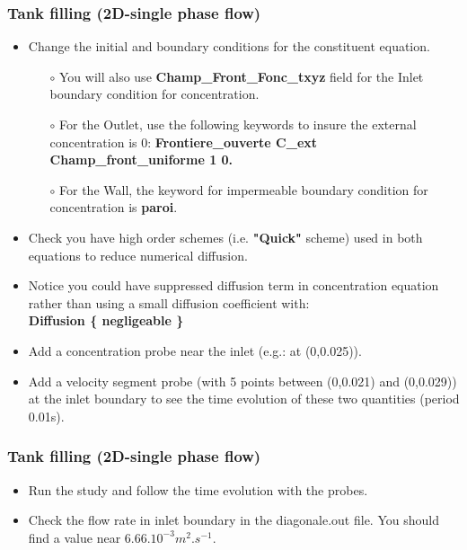 \documentclass[10pt]{beamer}
\begin{document}
\begin{frame}
\frametitle{Tank filling (2D-single phase flow)}
\begin{block}{}

\begin{itemize}
\item Change the initial and boundary conditions for the constituent equation. 
    \begin{itemize}
    \item [$\circ$] You will also use \textbf{Champ\_Front\_Fonc\_txyz} field for the Inlet boundary condition for concentration.
    \item [$\circ$] For the Outlet, use the following keywords to insure the external concentration is 0:
                    \textbf{Frontiere\_ouverte C\_ext Champ\_front\_uniforme 1 0.} \\
    \item [$\circ$] For the Wall, the keyword for impermeable boundary condition for concentration is \textbf{paroi}.
    \end{itemize}
\item Check you have high order schemes (i.e. \textbf{"Quick"} scheme) used in both equations to reduce numerical diffusion. 
\item Notice you could have suppressed diffusion term in concentration equation rather than using a small diffusion coefficient with:\\
\textbf{Diffusion \{ negligeable \}}
\item Add a concentration probe near the inlet (e.g.: at (0,0.025)).
\item Add a velocity segment probe (with 5 points between (0,0.021) and (0,0.029)) at the inlet boundary to see the time evolution of these two quantities (period 0.01s).
\end{itemize}

\end{block}
\end{frame}
\begin{frame}
\frametitle{Tank filling (2D-single phase flow)}
\begin{block}{}

\begin{itemize}
\item Run the study and follow the time evolution with the probes.
\item Check the flow rate in inlet boundary in the diagonale.out file. You should find a value near $6.66.10^{-3} m^2.s^{-1}$.
\end{itemize}

\end{block}
\end{frame}
\end{document}

